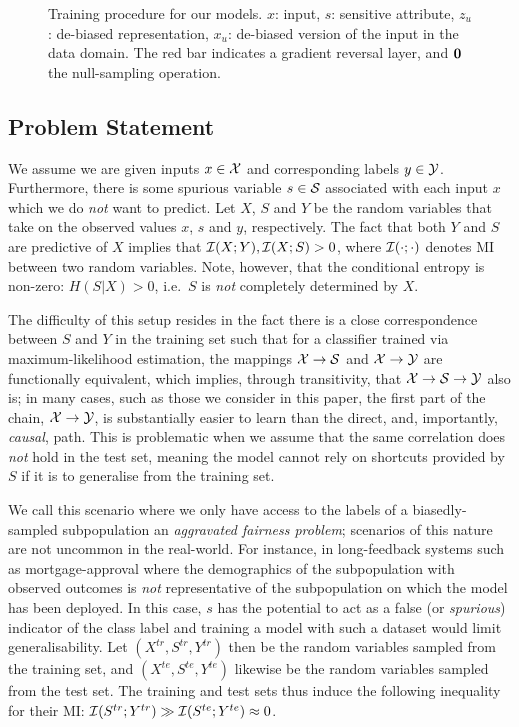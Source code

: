 \begin{figure}[tb]
{        \label{fig:cvae_diagram}
    }
    \hfill
    \caption{
        Training procedure for our models. $x$: input, $s$: sensitive attribute, $z_u$: de-biased
        representation, $x_u$: de-biased version of the input in the data domain. The red bar
        indicates a gradient reversal layer, and ${\bm{0}}$ the null-sampling operation.
    }%
    \label{fig:model-diagrams}
\end{figure}

\subsection{Problem Statement}
%
\noindent
%
We assume we are given inputs $x \in {\mathcal{X}}$ and corresponding labels $y \in {\mathcal{Y}}$.
%
Furthermore, there is some spurious variable $s \in {\mathcal{S}}$ associated with each input $x$ which
we do \emph{not} want to predict. 
%
Let $X$, $S$ and $Y$ be the random variables that take on the observed values $x$, $s$ and $y$,
respectively. 
%
The fact that both $Y$ and $S$ are predictive of $X$ implies that ${\mathcal{I}}(X;Y), {\mathcal{I}}(X;S) > 0$, where
${\mathcal{I}}(\cdot ;\cdot)$ denotes \ac{MI} between two random variables.
%
Note, however, that the conditional entropy is non-zero: \( H(S|X) > 0 \), i.e.\ $S$ is \emph{not}
completely determined by $X$.

The difficulty of this setup resides in the fact there is a close correspondence between $S$ and
$Y$ in the training set such that for a classifier trained via maximum-likelihood estimation, the
mappings \( {\mathcal{X}} \to {\mathcal{S}} \) and \({\mathcal{X}} \to {\mathcal{Y}} \) are functionally equivalent, which implies, through
transitivity, that \({\mathcal{X}} \to {\mathcal{S}} \to {\mathcal{Y}} \) also is; in many cases, such as those we consider in
this paper, the first part of the chain, \( {\mathcal{X}} \to {\mathcal{Y}} \), is substantially easier to learn than
the direct, and, importantly, \emph{causal}, path.
%
This is problematic when we assume that the same correlation does \emph{not} hold in the test set,
meaning the model cannot rely on shortcuts provided by $S$ if it is to generalise from the training
set.

We call this scenario where we only have access to the labels of a biasedly-sampled subpopulation
an \emph{aggravated fairness problem}; scenarios of this nature are not uncommon in the real-world. 
%
For instance, in long-feedback systems such as mortgage-approval where the demographics of the
subpopulation with observed outcomes is \emph{not} representative of the subpopulation on which the
model has been deployed. 
%
In this case, $s$ has the potential to act as a false (or \emph{spurious}) indicator of the class
label and training a model with such a dataset would limit generalisability. 
%
Let \( (X^{tr}, S^{tr}, Y^{tr}) \) then be the random variables sampled from the training set, and
\( (X^{te}, S^{te}, Y^{te}) \) likewise be the random variables sampled from the test set.
%
The training and test sets thus induce the following inequality for their \ac{MI}:
\( {\mathcal{I}}(S^{tr}; Y^{tr}) \gg {\mathcal{I}}(S^{te}; Y^{te}) \approx 0 \).

